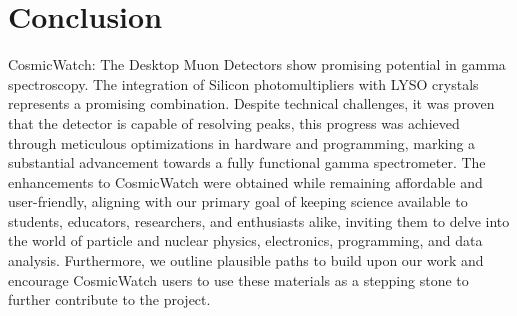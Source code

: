 \chapter{Conclusion}

CosmicWatch: The Desktop Muon Detectors show promising potential in gamma spectroscopy. The integration of Silicon photomultipliers with LYSO crystals represents a promising combination. Despite technical challenges, it was proven that the detector is capable of resolving peaks, this progress was achieved through meticulous optimizations in hardware and programming, marking a substantial advancement towards a fully functional gamma spectrometer. The enhancements to CosmicWatch were obtained while remaining affordable and user-friendly, aligning with our primary goal of keeping science available to students, educators, researchers, and enthusiasts alike, inviting them to delve into the world of particle and nuclear physics, electronics, programming, and data analysis. Furthermore, we outline plausible paths to build upon our work and encourage CosmicWatch users to use these materials as a stepping stone to further contribute to the project.